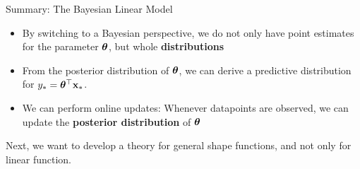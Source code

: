 \documentclass[11pt,compress,t,notes=noshow, xcolor=table]{beamer}
\begin{document}
\begin{vbframe}{Summary: The Bayesian Linear Model}

\begin{itemize}
  \item By switching to a Bayesian perspective, we do not only have point estimates for the parameter $\bm{\theta}$, but whole \textbf{distributions}
  \item From the posterior distribution of $\bm{\theta}$, we can derive a predictive distribution for $y_* = \bm{\theta}^\top \mathbf{x}_*$.  
  \item We can perform online updates: Whenever datapoints are observed, we can update the \textbf{posterior distribution} of $\bm{\theta}$
\end{itemize}

Next, we want to develop a theory for general shape functions, and not only for linear function. 

\end{vbframe}







% 
% 
% 
% 
% 
% 
% 
% 
% 

\end{document}
